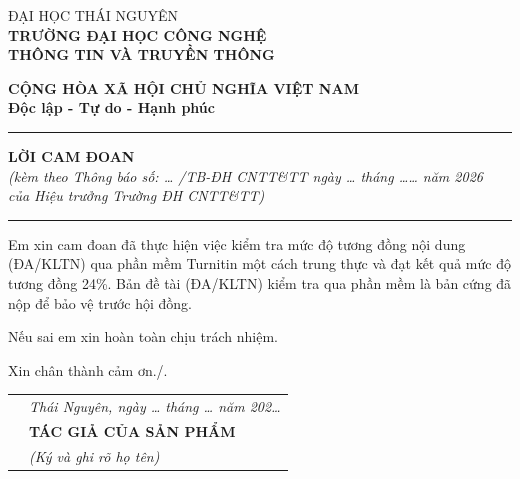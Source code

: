 \documentclass[../main.tex]{subfiles}
\begin{document}
\noindent
\begin{minipage}[t]{0.45\textwidth}
\centering
ĐẠI HỌC THÁI NGUYÊN \\
\textbf{TRƯỜNG ĐẠI HỌC CÔNG NGHỆ} \\
\textbf{THÔNG TIN VÀ TRUYỀN THÔNG}
\end{minipage}%
\begin{minipage}[t]{0.59\textwidth}
\centering
\textbf{CỘNG HÒA XÃ HỘI CHỦ NGHĨA VIỆT NAM} \\
\textbf{Độc lập - Tự do - Hạnh phúc} \\
\rule{0.6\linewidth}{0.4pt}
\end{minipage}

\vspace{1cm}

\begin{center}
\textbf{LỜI CAM ĐOAN}\\[0.3cm]
\textit{(kèm theo Thông báo số: \ldots{} /TB-ĐH CNTT\&TT ngày \ldots{} tháng \ldots\ldots{} năm 2026}\\
\textit{của Hiệu trưởng Trường ĐH CNTT\&TT)}\\[0.1cm]
\rule{0.4\textwidth}{0.4pt}
\end{center}

\vspace{0.5cm}

\hspace{1cm} Em xin cam đoan đã thực hiện việc kiểm tra mức độ tương đồng nội dung (ĐA/KLTN) qua phần mềm Turnitin một cách trung thực và đạt kết quả mức độ tương đồng 24\%. Bản đề tài (ĐA/KLTN) kiểm tra qua phần mềm là bản cứng đã nộp để bảo vệ trước hội đồng.

\hspace{1cm} Nếu sai em xin hoàn toàn chịu trách nhiệm.

\hspace{1cm} Xin chân thành cảm ơn./.

\vspace{1cm}

\begin{tabular}{p{} >{\centering\arraybackslash}p{}}
 & \textit{Thái Nguyên, ngày \ldots{} tháng \ldots{} năm 202\ldots} \\[0.5cm]
 & \textbf{TÁC GIẢ CỦA SẢN PHẨM} \\
 & \textit{(Ký và ghi rõ họ tên)} \\[2.5cm]
\end{tabular}
\end{document}
